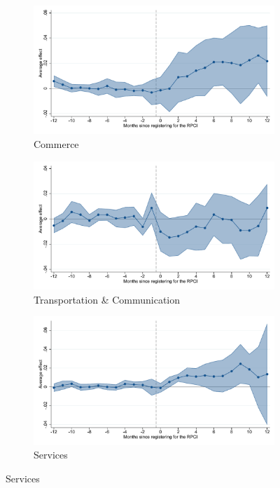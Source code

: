 \begin{figure}[H]
    \begin{subfigure}{0.32\textwidth}
    \caption{Commerce}
    \includegraphics[width=\textwidth]{04_Figures/muestra_10porciento/event_study_log_sal_cierre_ind_commerce_dcdh_connected.pdf}
    \end{subfigure}
    \begin{subfigure}{0.32\textwidth}
    \caption{Transportation \& Communication}
    \includegraphics[width=\textwidth]{04_Figures/muestra_10porciento/event_study_log_sal_cierre_ind_transport_dcdh_connected.pdf}
    \end{subfigure}
    \begin{subfigure}{0.32\textwidth}
    \caption{Services}
    \includegraphics[width=\textwidth]{04_Figures/muestra_10porciento/event_study_log_sal_cierre_ind_services_dcdh_connected.pdf}
    \end{subfigure}


\end{figure}
